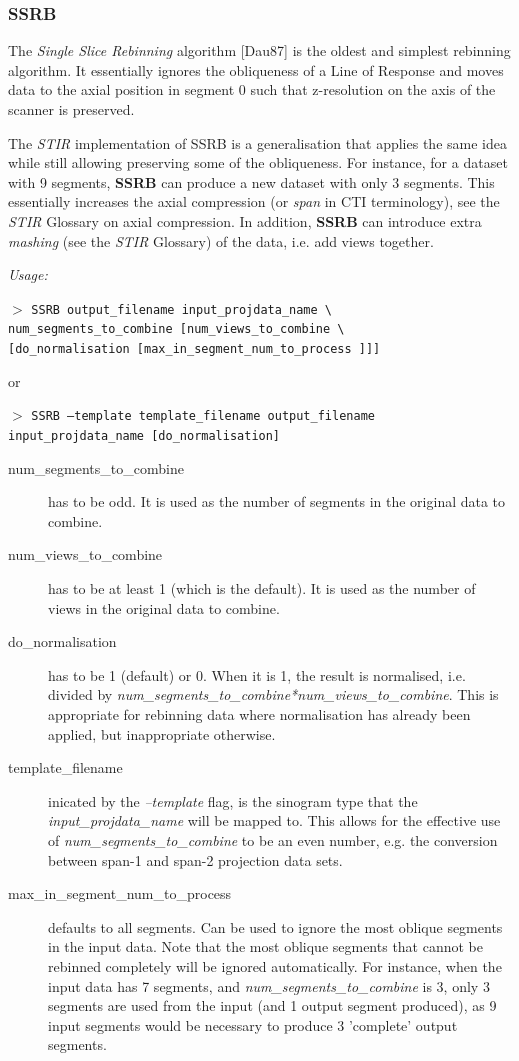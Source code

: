 \documentclass{article}
\newcommand{\cmdline}[1]{\par \noindent $>$ \texttt{#1}\par}
\begin{document}
\subsubsection{
SSRB}
\label{sec:SSRB}
The \textit{Single Slice Rebinning} algorithm [Dau87] is the oldest 
and simplest rebinning algorithm. It essentially ignores the 
obliqueness of a Line of Response and moves data to the axial 
position in segment 0 such that z-resolution on the axis of the 
scanner is preserved.


The \textit{STIR} implementation of SSRB is a generalisation that applies 
the same idea while still allowing preserving some of the obliqueness. 
For instance, for a dataset with 9 segments, \textbf{SSRB} can produce 
a new dataset with only 3 segments. This essentially increases 
the axial compression (or \textit{span} in CTI terminology), see the 
\textit{STIR} Glossary on axial compression. In addition, \textbf{SSRB} can 
introduce extra \textit{mashing} (see the \textit{STIR} Glossary) of the data, 
i.e. add views together.


\textit{Usage:}

\cmdline{SSRB output\_filename input\_projdata\_name {\textbackslash} \\
num\_segments\_to\_combine [num\_views\_to\_combine {\textbackslash}\\
{[}do\_normalisation [max\_in\_segment\_num\_to\_process ]]]}
or
\cmdline{SSRB --template template\_filename output\_filename input\_projdata\_name [do\_normalisation]}

\begin{description}
\item[num\_segments\_to\_combine] has to be odd. It is used as the 
number of segments in the original data to combine.
\item[num\_views\_to\_combine] has to be at least 1 (which 
is the default). It is used as the number of views in the original 
data to combine.
\item[do\_normalisation] has to be 1 (default) or 0. When it is 1, 
the result is normalised, i.e. divided by \textit{num\_segments\_to\_combine*num\_views\_to\_combine}. 
This is appropriate for rebinning data where normalisation has 
already been applied, but inappropriate otherwise.

\item[template\_filename] inicated by the \textit{--template} flag, 
is the sinogram type that the \textit{input\_projdata\_name} will 
be mapped to. This allows for the effective use of 
\textit{num\_segments\_to\_combine} to be an even number, 
e.g. the conversion between span-1 and span-2 projection data sets. 

\item[max\_in\_segment\_num\_to\_process] defaults to all segments. 
Can be used to ignore the most oblique segments in the input 
data. Note that the most oblique segments that cannot be rebinned 
completely will be ignored automatically. For instance, when 
the input data has 7 segments, and \textit{num\_segments\_to\_combine} is 
3, only 3 segments are used from the input (and 1 output segment 
produced), as 9 input segments would be necessary to produce 
3 'complete' output segments.
\end{description}
\end{document}
